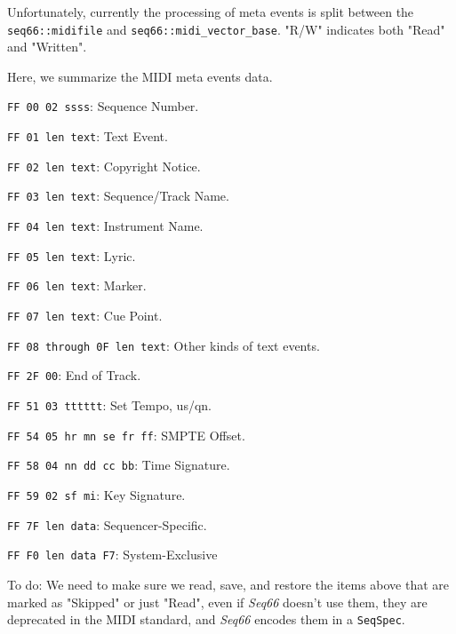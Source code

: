   Unfortunately, currently the processing of meta events is split between the
   \texttt{seq66::midifile} and
   \texttt{seq66::midi\_vector\_base}.
   "R/W" indicates both "Read" and "Written".

   Here, we summarize the MIDI meta events data.

   \begin{enumber}
      \item \texttt{FF 00 02 ssss}: Sequence Number.
      \item \texttt{FF 01 len text}: Text Event.
      \item \texttt{FF 02 len text}: Copyright Notice.
      \item \texttt{FF 03 len text}: Sequence/Track Name.
      \item \texttt{FF 04 len text}: Instrument Name.
      \item \texttt{FF 05 len text}: Lyric.
      \item \texttt{FF 06 len text}: Marker.
      \item \texttt{FF 07 len text}: Cue Point.
      \item \texttt{FF 08 through 0F len text}: Other kinds of  text events.
      \item \texttt{FF 2F 00}: End of Track.
      \item \texttt{FF 51 03 tttttt}: Set Tempo, us/qn.
      \item \texttt{FF 54 05 hr mn se fr ff}: SMPTE Offset.
      \item \texttt{FF 58 04 nn dd cc bb}: Time Signature.
      \item \texttt{FF 59 02 sf mi}: Key Signature.
      \item \texttt{FF 7F len data}: Sequencer-Specific.
      \item \texttt{FF F0 len data F7}: System-Exclusive
   \end{enumber}

   To do:
   We need to make sure we read, save, and restore the items above that are
   marked as "Skipped" or just "Read",
   even if \textsl{Seq66} doesn't use them, they are deprecated in the MIDI
   standard, and \textsl{Seq66} encodes them in a \texttt{SeqSpec}.

